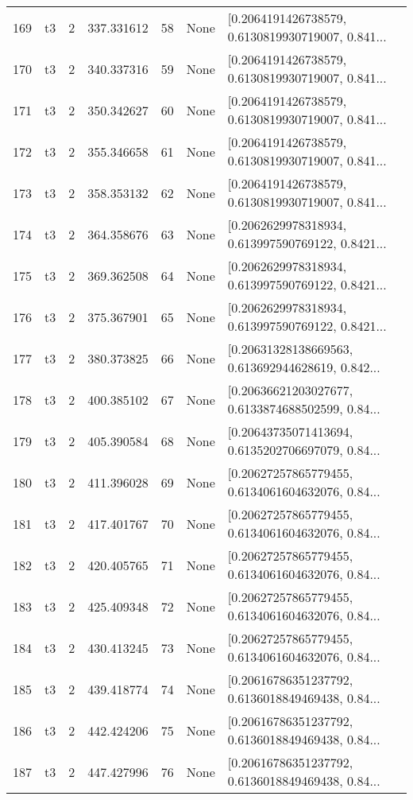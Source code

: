 \begin{tabular}{lllrlll}
169 &  t3 &   2 &  337.331612 &   58 &  None &  [0.2064191426738579, 0.6130819930719007, 0.841... \\
170 &  t3 &   2 &  340.337316 &   59 &  None &  [0.2064191426738579, 0.6130819930719007, 0.841... \\
171 &  t3 &   2 &  350.342627 &   60 &  None &  [0.2064191426738579, 0.6130819930719007, 0.841... \\
172 &  t3 &   2 &  355.346658 &   61 &  None &  [0.2064191426738579, 0.6130819930719007, 0.841... \\
173 &  t3 &   2 &  358.353132 &   62 &  None &  [0.2064191426738579, 0.6130819930719007, 0.841... \\
174 &  t3 &   2 &  364.358676 &   63 &  None &  [0.2062629978318934, 0.613997590769122, 0.8421... \\
175 &  t3 &   2 &  369.362508 &   64 &  None &  [0.2062629978318934, 0.613997590769122, 0.8421... \\
176 &  t3 &   2 &  375.367901 &   65 &  None &  [0.2062629978318934, 0.613997590769122, 0.8421... \\
177 &  t3 &   2 &  380.373825 &   66 &  None &  [0.20631328138669563, 0.613692944628619, 0.842... \\
178 &  t3 &   2 &  400.385102 &   67 &  None &  [0.20636621203027677, 0.6133874688502599, 0.84... \\
179 &  t3 &   2 &  405.390584 &   68 &  None &  [0.20643735071413694, 0.6135202706697079, 0.84... \\
180 &  t3 &   2 &  411.396028 &   69 &  None &  [0.20627257865779455, 0.6134061604632076, 0.84... \\
181 &  t3 &   2 &  417.401767 &   70 &  None &  [0.20627257865779455, 0.6134061604632076, 0.84... \\
182 &  t3 &   2 &  420.405765 &   71 &  None &  [0.20627257865779455, 0.6134061604632076, 0.84... \\
183 &  t3 &   2 &  425.409348 &   72 &  None &  [0.20627257865779455, 0.6134061604632076, 0.84... \\
184 &  t3 &   2 &  430.413245 &   73 &  None &  [0.20627257865779455, 0.6134061604632076, 0.84... \\
185 &  t3 &   2 &  439.418774 &   74 &  None &  [0.20616786351237792, 0.6136018849469438, 0.84... \\
186 &  t3 &   2 &  442.424206 &   75 &  None &  [0.20616786351237792, 0.6136018849469438, 0.84... \\
187 &  t3 &   2 &  447.427996 &   76 &  None &  [0.20616786351237792, 0.6136018849469438, 0.84... \\

\end{tabular}
